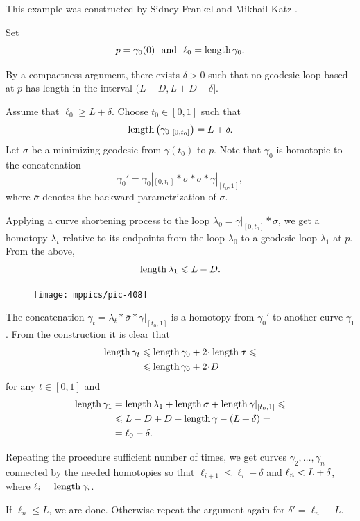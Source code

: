 This example was constructed by Sidney Frankel and Mikhail Katz \cite{frankel-katz}.
 

Set 
\[p=\gamma_0(0)\ \ \text{and}\ \  \ell_0=\length\gamma_0.\]

By a compactness argument,
there exists $\delta>0$ 
such that no geodesic loop based at $p$ has length in the interval $(L-D, L+D+\delta]$. 

Assume that $\ell_0\ge L+\delta$.
Choose $t_0\in [0,1]$ such that
\[\operatorname{\rm length}\left(\gamma_0|_{[0,t_0]}\right)=L+\delta.\]
Let $\sigma$ be a minimizing geodesic from $\gamma(t_0)$
to $p$.
Note that $\gamma_0$ is homotopic to the concatenation 
\[\gamma_0'=\gamma_0|_{[0,t_0]}*\sigma*\bar\sigma*\gamma|_{[t_0,1]},\]
where $\bar\sigma$ denotes the backward parametrization of $\sigma$.

Applying a curve shortening process to the loop $\lambda_0=\gamma|_{[0,t_0]}*\sigma$, 
we get a  homotopy $\lambda_t$
relative to its endpoints 
from the loop $\lambda_0$ to a geodesic loop $\lambda_1$ at $p$.
From the above, 
\[\operatorname{\rm length}\lambda_1\leqslant L-D.\]

\begin{figure}
\vskip-6mm
\centering
\texttt{[image: mppics/pic-408]}
\end{figure}

The concatenation $\gamma_t=\lambda_t*\bar\sigma*\gamma|_{[t_0,1]}$
is a homotopy
from $\gamma_0'$ to another curve $\gamma_1$.
From the construction it is clear that 
\begin{align*}
 \length \gamma_t&\le \length \gamma_0+2\cdot \length\sigma\le
 \\
 &\le \length \gamma_0+2\cdot D
\end{align*}
for any $t\in[0,1]$
and 
\begin{align*}
 \operatorname{\rm length} \gamma_1&=\operatorname{\rm length}\lambda_1+\operatorname{\rm length}\sigma+\operatorname{\rm length}\gamma|_{[t_0,1]}\leqslant
\\ &\leqslant L-D+D+\operatorname{\rm length}\gamma-(L+\delta)=
\\ &=\ell_0 -\delta.
\end{align*}

Repeating the procedure sufficient number of times, we get curves $\gamma_2,\dots,\gamma_n$
connected by the needed homotopies so that 
$\ell_{i+1}\le\ell_i-\delta$ and $\ell_n\z< L+\delta$,
where $\ell_i=\operatorname{\rm length}\gamma_i$.

If $\ell_n\le L$, we are done.
Otherwise repeat the argument again for $\delta'=\ell_n-L$.
\qeds

